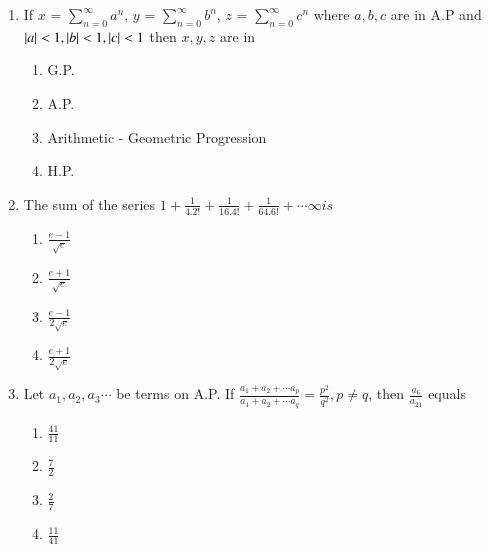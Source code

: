 \documentclass[journal,12pt,twocolumn]{IEEEtran}
\theoremstyle{remark}
\begin{document}
\begin{enumerate}[label={\arabic*.}]
\item {If $x$ = $\sum\limits_{n=0}^{\infty}a^n$, $y$ = $\sum\limits_{n=0}^{\infty}b^n$, $z$ = $\sum\limits_{n=0}^{\infty}c^n$ where $a,b,c$ are in A.P and $\left\vert a\right\vert<1,\left\vert b\right\vert<1,\left\vert c\right\vert<1$ then $x,y,z$ are in}
{\hfill{}} 
\begin{enumerate}[label={\brak{\alph*}}]
\item  {G.P.}
\item  {A.P.}
\item  {Arithmetic - Geometric Progression}
\item  {H.P.}
\end{enumerate}

\item {The sum of the series $1+\frac{1}{4.2!}+\frac{1}{16.4!}+\frac{1}{64.6!}+\cdots \infty is$}
{\hfill{}} 
\begin{enumerate}[label={\brak{\alph*}}]
\item  {$\frac{e-1}{\sqrt{e}}$}
\item  {$\frac{e+1}{\sqrt{e}}$}
\item  {$\frac{e-1}{2\sqrt{e}}$}
\item  {$\frac{e+1}{2\sqrt{e}}$}
\end{enumerate}

\item {Let $a_1, a_2, a_3 \cdots$ be terms on A.P. If $\frac{a_1+a_2+\cdots a_p}{a_1+a_2+\cdots a_q}= \frac{p^2}{q^2},p \neq q$, then $\frac{a_6}{a_{21}}$ equals}
{\hfill{} }
\begin{enumerate}[label={\brak{\alph*}}]
\item  {$\frac{41}{11}$}
\item  {$\frac{7}{2}$}
\item  {$\frac{2}{7}$}
\item  {$\frac{11}{41}$}
\end{enumerate}




\end{enumerate}
\end{document}
